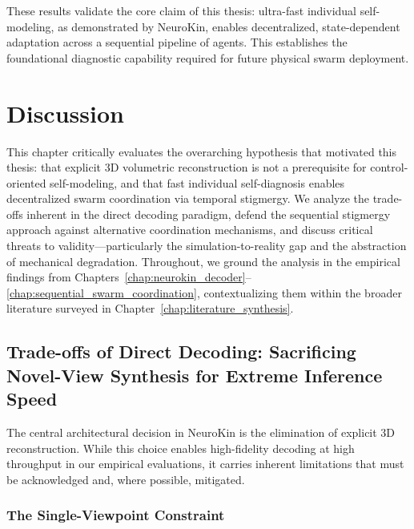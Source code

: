 \documentclass[12pt,a4paper,oneside]{report}
\begin{document}
These results validate the core claim of this thesis: ultra-fast individual self-modeling, as demonstrated by NeuroKin, enables decentralized, state-dependent adaptation across a sequential pipeline of agents. This establishes the foundational diagnostic capability required for future physical swarm deployment.





















\chapter{Discussion}
\label{chap:discussion}

This chapter critically evaluates the overarching hypothesis that motivated this thesis: that explicit 3D volumetric reconstruction is not a prerequisite for control-oriented self-modeling, and that fast individual self-diagnosis enables decentralized swarm coordination via temporal stigmergy. We analyze the trade-offs inherent in the direct decoding paradigm, defend the sequential stigmergy approach against alternative coordination mechanisms, and discuss critical threats to validity—particularly the simulation-to-reality gap and the abstraction of mechanical degradation. Throughout, we ground the analysis in the empirical findings from Chapters~\ref{chap:neurokin_decoder}--\ref{chap:sequential_swarm_coordination}, contextualizing them within the broader literature surveyed in Chapter~\ref{chap:literature_synthesis}.

\section{Trade-offs of Direct Decoding: Sacrificing Novel-View Synthesis for Extreme Inference Speed}

The central architectural decision in NeuroKin is the elimination of explicit 3D reconstruction. While this choice enables high-fidelity decoding at high throughput in our empirical evaluations, it carries inherent limitations that must be acknowledged and, where possible, mitigated.

\subsection{The Single-Viewpoint Constraint}
\label{subsec:the_single_viewpoint_constraint}
\end{document}
